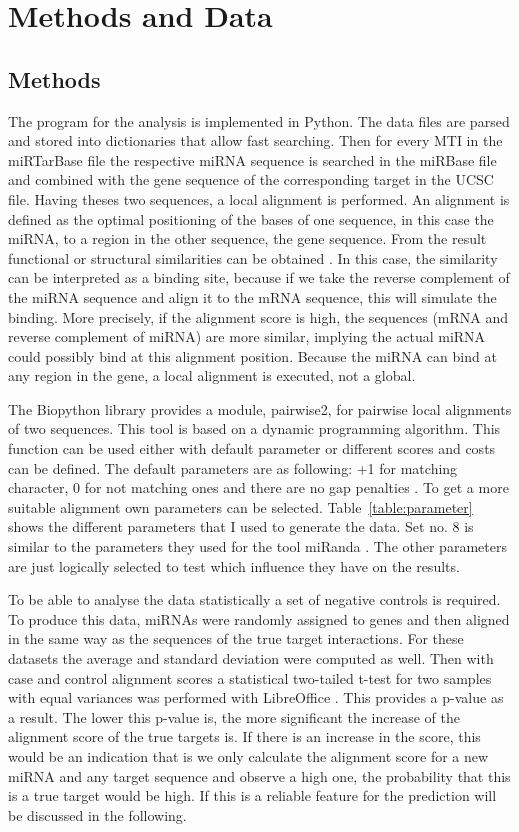 \documentclass[12pt]{article}
\begin{document}
\section{Methods and Data}
\subsection{Methods}
The program for the analysis is implemented in Python. The data files are parsed and stored into dictionaries that allow fast searching. Then for every MTI in the miRTarBase file the respective miRNA sequence is searched in the miRBase file and combined with the gene sequence of the corresponding target in the UCSC file. Having theses two sequences, a local alignment is performed. An alignment is defined as the optimal positioning of the bases of one sequence, in this case the miRNA, to a region in the other sequence, the gene sequence. From the result functional or structural similarities can be obtained \cite{alignment}. In this case, the similarity can be interpreted as a binding site, because if we take the reverse complement of the miRNA sequence and align it to the mRNA sequence, this will simulate the binding. More precisely, if the alignment score is high, the sequences (mRNA and reverse complement of miRNA) are more similar, implying  the actual miRNA could possibly bind at this alignment position. Because the miRNA can bind at any region in the gene, a local alignment is executed, not a global.

The Biopython library provides a module, pairwise2, for pairwise local alignments of two sequences. This tool is based on a dynamic programming algorithm. This function can be used either with default parameter or different scores and costs can be defined. The default parameters are as following: +1 for matching character, 0 for not matching ones and there are no gap penalties \cite{pairwise}. To get a more suitable alignment own parameters can be selected. Table~\ref{table:parameter} shows the different parameters that I used to generate the data. Set no. 8 is similar to the parameters they used for the tool miRanda \cite{Enright}. The other parameters are just logically selected to test which influence they have on the results. 

To be able to analyse the data statistically a set of negative controls is required. To produce this data, miRNAs were randomly assigned to genes and then aligned in the same way as the sequences of the true target interactions. For these datasets the average and standard deviation were computed as well. Then with case and control alignment scores a statistical two-tailed t-test for two samples with equal variances was performed with LibreOffice \cite{ttest}. This provides a p-value as a result. The lower this p-value is, the more significant the increase of the alignment score of the true targets is. If there is an increase in the score, this would be an indication that is we only calculate the alignment score for a new miRNA and any target sequence and observe a high one, the probability that this is a true target would be high. If this is a reliable feature for the prediction will be discussed in the following.
\end{document}
